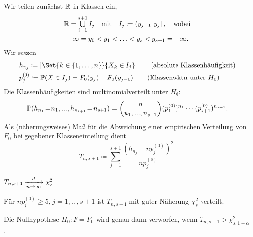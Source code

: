 \documentclass{cheat-sheet}
\renewcommand{\P}{\mathbb{P}} %
\begin{document}

\begin{verf}
  Wir teilen zunächst $\mathbb{R}$ in Klassen ein,
  \begin{align*}
    & \R = \bigcup_{i=1}^{s+1} I_j
    \quad \text{mit} \quad
    I_j \coloneqq \ocinterval{y_{j-1}}{y_j},
    \quad
    \text{wobei} \\
    & - \infty = y_0 < y_1 < \ldots < y_s < y_{s+1} = + \infty.
  \end{align*}
  Wir setzen
  \begin{align*}
    & h_{n_j} \coloneqq \abs{\Set{k \in \{ 1, \ldots, n \}}{X_k \in I_j}} \tag{absolute Klassenhäufigkeit} \\
    & p_j^{(0)} \coloneqq \P(X \in I_j) = F_0(y_j) - F_0(y_{j-1}) \tag{Klassenwktn unter $H_0$}
  \end{align*}
  Die Klassenhäufigkeiten sind multinomialverteilt unter $H_0$:
  \[ \P(h_{n_1} \!=\! n_1, \nldots, h_{n_{s+1}} \!=\! n_{s+1}) = \binom{n}{n_1, \nldots, n_{s+1}} (p_1^{(0)})^{n_1} \cdots (p_{s+1}^{(0)})^{n_{s+1}}. \]
  Als (näherungsweises) Maß für die Abweichung einer empirischen Verteilung von $F_0$ bei gegebener Klasseneinteilung dient
  \[ T_{n,s+1} \coloneqq \sum_{j=1}^{s+1} \frac{(h_{n_j} - n p_j^{(0)})^2}{n p_j^{(0)}}. \]
\end{verf}

\begin{satz}
  $T_{n,s+1} \xrightarrow[n \to \infty]{d} \chi_s^2$
\end{satz}

\begin{faustregel}
  Für $n p_j^{(0)} \geq 5$, $j = 1, \ldots, s+1$ ist $T_{n,s+1}$ mit guter Näherung $\chi_s^2$-verteilt.
\end{faustregel}


\begin{entscheidungsregel}
  Die Nullhypothese $H_0 : F = F_0$ wird genau dann verworfen, wenn $T_{n,s+1} > \chi^2_{s,1-\alpha}$.
\end{entscheidungsregel}
\end{document}
